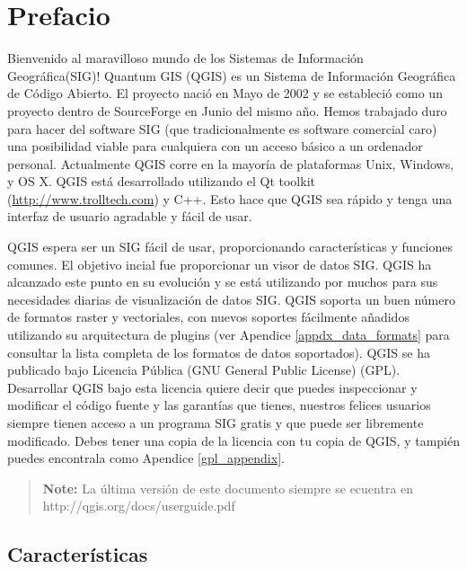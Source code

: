 
\section{Prefacio}\label{label_forward}
\setcounter{page}{1}

Bienvenido al maravilloso mundo de los Sistemas de Información Geográfica(SIG)!
Quantum GIS (QGIS) es un Sistema de Información Geográfica de Código Abierto. 
El proyecto nació en Mayo de 2002 y se estableció como un proyecto dentro de 
SourceForge en Junio del mismo año. Hemos trabajado duro para hacer del 
software SIG (que tradicionalmente es software comercial caro) una posibilidad
viable para cualquiera con un acceso básico a un ordenador personal. 
Actualmente QGIS corre en la mayoría de plataformas Unix, Windows, y OS X. 
QGIS está desarrollado utilizando el Qt toolkit (\url{http://www.trolltech.com})
y C++. Esto hace que QGIS sea rápido y tenga una interfaz de usuario agradable
y fácil de usar. 

QGIS espera ser un SIG fácil de usar, proporcionando características y 
funciones comunes. El objetivo incial fue proporcionar un visor de datos SIG. 
QGIS ha alcanzado este punto en su evolución y se está utilizando por muchos 
para sus necesidades diarias de visualización de datos SIG. QGIS soporta un 
buen número de formatos raster y vectoriales, con nuevos soportes fácilmente
añadidos utilizando su arquitectura de plugins (ver Apendice \ref{appdx_data_formats} 
para consultar la lista completa de los formatos de datos soportados).
QGIS se ha publicado bajo Licencia Pública (GNU General Public License) (GPL). 
Desarrollar QGIS bajo esta licencia quiere decir que puedes inspeccionar y 
modificar el código fuente y las garantías que tienes, nuestros felices 
usuarios siempre tienen acceso a un programa SIG gratis y que puede ser 
libremente modificado. Debes tener una copia de la licencia con tu copia 
de QGIS, y tampién puedes encontrala como Apendice \ref{gpl_appendix}.  

\begin{quote}
\begin{center}
\textbf{Note:} La última versión de este documento siempre se ecuentra en \newline
http://qgis.org/docs/userguide.pdf 
\end{center}
\end{quote}

\subsection{Características}\label{label_majfeat}

